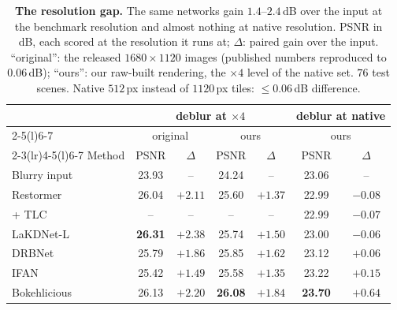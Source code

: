 \begin{table}[t]
  \centering
  \small
  \setlength{\tabcolsep}{2.2pt}
  \begin{tabular}{@{}lcccccc@{}}
    \toprule
    & \multicolumn{4}{c}{deblur at $\times4$} & \multicolumn{2}{c}{deblur at native} \\
    \cmidrule(lr){2-5}\cmidrule(l){6-7}
    & \multicolumn{2}{c}{original} & \multicolumn{2}{c}{ours} & \multicolumn{2}{c}{ours} \\
    \cmidrule(lr){2-3}\cmidrule(lr){4-5}\cmidrule(l){6-7}
    Method & PSNR & $\Delta$ & PSNR & $\Delta$ & PSNR & $\Delta$ \\
    \midrule
    Blurry input & 23.93 & -- & 24.24 & -- & 23.06 & -- \\
    Restormer~\cite{zamir2022restormer} & 26.04 & $+2.11$ & 25.60 & $+1.37$ & 22.99 & $-0.08$ \\
    \quad + TLC~\cite{chu2022tlc} & -- & -- & -- & -- & 22.99 & $-0.07$ \\
    LaKDNet-L~\cite{ruan2023lakdnet} & \textbf{26.31} & $+2.38$ & 25.74 & $+1.50$ & 23.00 & $-0.06$ \\
    DRBNet~\cite{ruan2022drbnet} & 25.79 & $+1.86$ & 25.85 & $+1.62$ & 23.12 & $+0.06$ \\
    IFAN~\cite{lee2021ifan} & 25.42 & $+1.49$ & 25.58 & $+1.35$ & 23.22 & $+0.15$ \\
    Bokehlicious~\cite{seizinger2025bokehlicious} & 26.13 & $+2.20$ & \textbf{26.08} & $+1.84$ & \textbf{23.70} & $+0.64$ \\
    \bottomrule
  \end{tabular}
  \caption{\textbf{The resolution gap.} The same networks gain $1.4$--$2.4$\,dB over the input at the
  benchmark resolution and almost nothing at native resolution. PSNR in dB, each scored at the resolution it
  runs at; $\Delta$: paired gain over the input. ``original'': the released $1680\times1120$ images (published
  numbers reproduced to $0.06$\,dB); ``ours'': our raw-built rendering, the $\times4$ level of the native set.
  $76$ test scenes. Native $512$\,px instead of $1120$\,px tiles: $\leq 0.06$\,dB difference.
  }
  \label{tab:gap}
\end{table}

